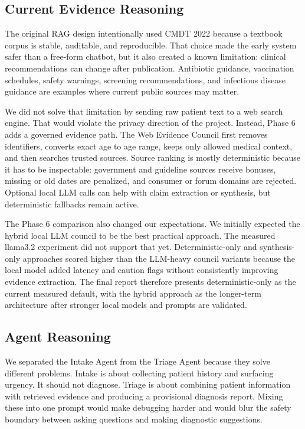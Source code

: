 \subsection{Current Evidence Reasoning}

The original RAG design intentionally used CMDT 2022 because a textbook corpus is stable, auditable, and reproducible. That choice made the early system safer than a free-form chatbot, but it also created a known limitation: clinical recommendations can change after publication. Antibiotic guidance, vaccination schedules, safety warnings, screening recommendations, and infectious disease guidance are examples where current public sources may matter.

We did not solve that limitation by sending raw patient text to a web search engine. That would violate the privacy direction of the project. Instead, Phase 6 adds a governed evidence path. The Web Evidence Council first removes identifiers, converts exact age to age range, keeps only allowed medical context, and then searches trusted sources. Source ranking is mostly deterministic because it has to be inspectable: government and guideline sources receive bonuses, missing or old dates are penalized, and consumer or forum domains are rejected. Optional local LLM calls can help with claim extraction or synthesis, but deterministic fallbacks remain active.

The Phase 6 comparison also changed our expectations. We initially expected the hybrid local LLM council to be the best practical approach. The measured llama3.2 experiment did not support that yet. Deterministic-only and synthesis-only approaches scored higher than the LLM-heavy council variants because the local model added latency and caution flags without consistently improving evidence extraction. The final report therefore presents deterministic-only as the current measured default, with the hybrid approach as the longer-term architecture after stronger local models and prompts are validated.

\subsection{Agent Reasoning}

We separated the Intake Agent from the Triage Agent because they solve different problems. Intake is about collecting patient history and surfacing urgency. It should not diagnose. Triage is about combining patient information with retrieved evidence and producing a provisional diagnosis report. Mixing these into one prompt would make debugging harder and would blur the safety boundary between asking questions and making diagnostic suggestions.

